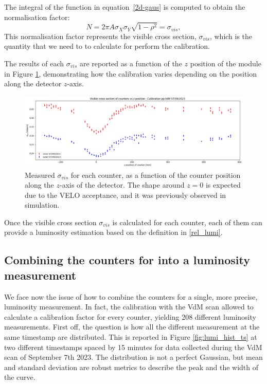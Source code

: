 The integral of the function in equation~\eqref{2d-gaus} is computed to obtain the normalisation factor: 
\begin{equation}
    N = 2\pi A \sigma_{X}\sigma_{Y}\sqrt {1-\rho ^{2}}=\sigma_{vis},\label{2d-gaus-norm}
\end{equation}
This normalisation factor represents the visible cross section, $\sigma_{vis}$, which is the quantity that we need to to calculate for perform the calibration.

 The results of each $\sigma_{vis}$ are reported as a function of the $z$ position of the module in Figure \ref{fig:coefficient_pos}, demonstrating how the calibration varies depending on the position along the detector $z$-axis.

\begin{figure}
    \centering
    \includegraphics[width=\textwidth]{figures/coefficient_pos.png}
    \caption{Measured $\sigma_{vis}$ for each counter, as a function of the counter position along the $z$-axis of the detector. The shape around $z=0$ is expected due to the VELO acceptance, and it was previously observed in simulation.}
    \label{fig:coefficient_pos}
\end{figure}

Once the visible cross section $\sigma_{vis}$ is calculated for each counter, each of them can provide a luminosity estimation based on the definition in \eqref{rel_lumi}.

\subsection{Combining the counters for into a luminosity measurement}
We face now the issue of how to combine the counters for a single, more precise, luminosity measurement. In fact, the calibration with the VdM scan allowed to calculate a calibration factor for every counter, yielding 208 different luminosity measurements. 
First off, the question is how all the different measurement at the same timestamp are distributed. 
This is reported in Figure \ref{fig:lumi_hist_ts} at two different timestamps spaced by 15 minutes for data collected during the VdM scan of September 7th 2023. The distribution is not a perfect Gaussian, but mean and standard deviation are robust metrics to describe the peak and the width of the curve. 


